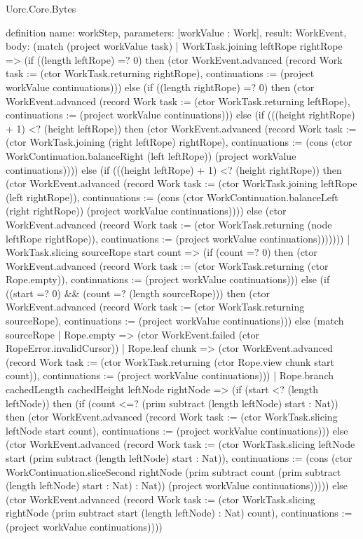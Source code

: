 \begin{lexlean}{Uorc.Core.Bytes}
\begin{semanticmodule}
definition{
  name: workStep,
  parameters: [workValue : Work],
  result: WorkEvent,
  body: (match (project workValue task)
    | WorkTask.joining leftRope rightRope => (if ((length leftRope) =? 0) then (ctor WorkEvent.advanced (record Work {task := (ctor WorkTask.returning rightRope), continuations := (project workValue continuations)})) else (if ((length rightRope) =? 0) then (ctor WorkEvent.advanced (record Work {task := (ctor WorkTask.returning leftRope), continuations := (project workValue continuations)})) else (if (((height rightRope) + 1) <? (height leftRope)) then (ctor WorkEvent.advanced (record Work {task := (ctor WorkTask.joining (right leftRope) rightRope), continuations := (cons (ctor WorkContinuation.balanceRight (left leftRope)) (project workValue continuations))})) else (if (((height leftRope) + 1) <? (height rightRope)) then (ctor WorkEvent.advanced (record Work {task := (ctor WorkTask.joining leftRope (left rightRope)), continuations := (cons (ctor WorkContinuation.balanceLeft (right rightRope)) (project workValue continuations))})) else (ctor WorkEvent.advanced (record Work {task := (ctor WorkTask.returning (node leftRope rightRope)), continuations := (project workValue continuations)}))))))
    | WorkTask.slicing sourceRope start count => (if (count =? 0) then (ctor WorkEvent.advanced (record Work {task := (ctor WorkTask.returning (ctor Rope.empty)), continuations := (project workValue continuations)})) else (if ((start =? 0) && (count =? (length sourceRope))) then (ctor WorkEvent.advanced (record Work {task := (ctor WorkTask.returning sourceRope), continuations := (project workValue continuations)})) else (match sourceRope
      | Rope.empty => (ctor WorkEvent.failed (ctor RopeError.invalidCursor))
      | Rope.leaf chunk => (ctor WorkEvent.advanced (record Work {task := (ctor WorkTask.returning (ctor Rope.view chunk start count)), continuations := (project workValue continuations)}))
      | Rope.branch cachedLength cachedHeight leftNode rightNode => (if (start <? (length leftNode)) then (if (count <=? (prim subtract (length leftNode) start : Nat)) then (ctor WorkEvent.advanced (record Work {task := (ctor WorkTask.slicing leftNode start count), continuations := (project workValue continuations)})) else (ctor WorkEvent.advanced (record Work {task := (ctor WorkTask.slicing leftNode start (prim subtract (length leftNode) start : Nat)), continuations := (cons (ctor WorkContinuation.sliceSecond rightNode (prim subtract count (prim subtract (length leftNode) start : Nat) : Nat)) (project workValue continuations))}))) else (ctor WorkEvent.advanced (record Work {task := (ctor WorkTask.slicing rightNode (prim subtract start (length leftNode) : Nat) count), continuations := (project workValue continuations)})))
}
\end{semanticmodule}
\end{lexlean}
